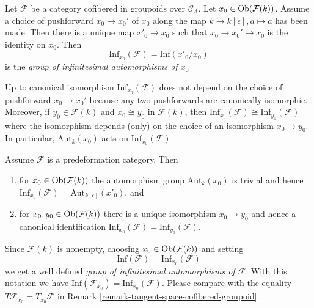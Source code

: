 \begin{definition}
\label{definition-infinitesimal-auts}
Let $\mathcal{F}$ be a category cofibered in groupoids over $\mathcal
C_\Lambda$. Let $x_0 \in \mathop{\mathrm{Ob}}\nolimits(\mathcal{F}(k))$. Assume a choice of
pushforward $x_0 \to x_0'$ of $x_0$ along the map
$k \to k[\epsilon], a \mapsto a$ has been made.
Then there is a unique map $x'_0 \to x_0$ such that
$x_0 \to x_0' \to x_0$ is the identity on $x_0$.
Then
$$
\text{Inf}_{x_0}(\mathcal F) = \text{Inf}(x'_0/x_0)
$$
is the {\it group of infinitesimal automorphisms of $x_0$}
\end{definition}

\begin{remark}
\label{remark-choice-pushforward-immaterial-infinitesimal-aut}
Up to canonical isomorphism $\text{Inf}_{x_0}(\mathcal{F})$
does not depend on the choice of pushforward $x_0 \to x_0'$
because any two pushforwards are canonically isomorphic.
Moreover, if $y_0 \in \mathcal{F}(k)$ and $x_0 \cong y_0$ in
$\mathcal{F}(k)$, then
$\text{Inf}_{x_0}(\mathcal{F}) \cong \text{Inf}_{y_0}(\mathcal{F})$
where the isomorphism depends (only) on the choice of an isomorphism
$x_0 \to y_0$. In particular, $\text{Aut}_k(x_0)$
acts on $\text{Inf}_{x_0}(\mathcal{F})$.
\end{remark}

\begin{remark}
\label{remark-trivial-aut-point}
Assume $\mathcal{F}$ is a predeformation category. Then
\begin{enumerate}
\item for $x_0 \in \mathop{\mathrm{Ob}}\nolimits(\mathcal{F}(k))$ the automorphism group
$\text{Aut}_k(x_0)$ is trivial and hence
$\text{Inf}_{x_0}(\mathcal{F}) = \text{Aut}_{k[\epsilon]}(x'_0)$, and
\item for $x_0, y_0 \in \mathop{\mathrm{Ob}}\nolimits(\mathcal{F}(k))$ there is a unique
isomorphism $x_0 \to y_0$ and hence a canonical identification
$\text{Inf}_{x_0}(\mathcal{F}) = \text{Inf}_{y_0}(\mathcal{F})$.
\end{enumerate}
Since $\mathcal{F}(k)$ is nonempty, choosing $x_0 \in \mathop{\mathrm{Ob}}\nolimits(\mathcal{F}(k))$
and setting
$$
\text{Inf}(\mathcal{F}) = \text{Inf}_{x_0}(\mathcal{F})
$$
we get a well defined {\it group of infinitesimal automorphisms
of $\mathcal{F}$}. With this notation we have
$\text{Inf}(\mathcal{F}_{x_0}) = \text{Inf}_{x_0}(\mathcal{F})$.
Please compare with the equality
$T\mathcal{F}_{x_0} = T_{x_0}\mathcal{F}$
in Remark \ref{remark-tangent-space-cofibered-groupoid}.
\end{remark}

